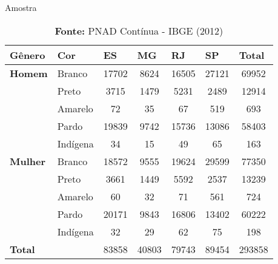 \documentclass[xcolor={dvipsnames}]{beamer}
\begin{document}
\begin{frame}{Amostra}
    \begin{table}[H]
\caption{Distribuição da Amostra para a região Sudeste}
\centering
\begin{adjustbox}{width=.8\columnwidth,center}
\begin{tabular}{@{}llccccc@{}}
\toprule
\textbf{Gênero} &
  \textbf{Cor} &
  \multicolumn{1}{l}{\textbf{ES}} &
  \multicolumn{1}{l}{\textbf{MG}} &
  \multicolumn{1}{l}{\textbf{RJ}} &
  \multicolumn{1}{l}{\textbf{SP}} &
  \multicolumn{1}{l}{\textbf{Total}} \\ \midrule
\textbf{Homem}  & Branco   & 17702 & 8624  & 16505 & 27121 & 69952  \\
\textbf{}       & Preto    & 3715  & 1479  & 5231  & 2489  & 12914  \\
\textbf{}       & Amarelo  & 72    & 35    & 67    & 519   & 693    \\
\textbf{}       & Pardo    & 19839 & 9742  & 15736 & 13086 & 58403  \\
\textbf{}       & Indígena & 34    & 15    & 49    & 65    & 163    \\
\textbf{Mulher} & Branco   & 18572 & 9555  & 19624 & 29599 & 77350  \\
\textbf{}       & Preto    & 3661  & 1449  & 5592  & 2537  & 13239  \\
\textbf{}       & Amarelo  & 60    & 32    & 71    & 561   & 724    \\
\textbf{}       & Pardo    & 20171 & 9843  & 16806 & 13402 & 60222  \\
\textbf{}       & Indígena & 32    & 29    & 62    & 75    & 198    \\ \midrule
\textbf{Total}  &          & 83858 & 40803 & 79743 & 89454 & 293858 \\ \bottomrule
\end{tabular}
\end{adjustbox}
\caption*{\textbf{Fonte:} PNAD Contínua - IBGE (2012)}
\end{table}
\end{frame}
\end{document}
